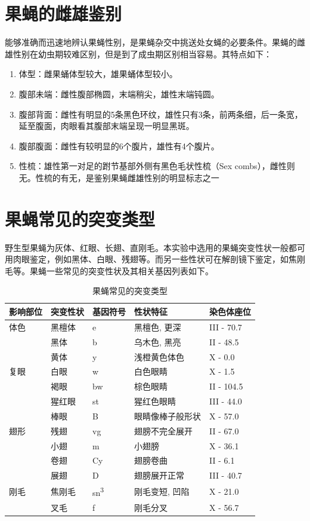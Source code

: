 \documentclass[AutoFakeBold]{LZUThesis}
\begin{document}
\section{果蝇的雌雄鉴别}
能够准确而迅速地辨认果蝇性别，是果蝇杂交中挑送处女蝇的必要条件。果蝇的雌雄性别在幼虫期较难区别，但是到了成虫期区别相当容易。其特点如下：
\begin{enumerate}
    \item 体型：雌果蛹体型较大，雄果蛹体型较小。
    \item 腹部未端：雌性腹部椭圆，末端稍尖，雄性末端钝圆。
    \item 腹部背面：雌性有明显的5条黑色环纹，雄性只有3条，前两条细，后一条宽，延至腹面，肉眼看其腹部末端呈现一明显黑斑。
    \item 腹部腹面：雌性有较明显的6个腹片，雄性有4个腹片。
    \item 性梳：雄性第一对足的跗节基部外侧有黑色毛状性梳（Sex combs），雌性则无。性梳的有无，是鉴别果蝇雌雄性别的明显标志之一
\end{enumerate}

\section{果蝇常见的突变类型}
野生型果蝇为灰体、红眼、长翅、直刚毛。本实验中选用的果蝇突变性状一般都可用肉眼鉴定，例如黑体、白眼、残翅等。而另一些性状可在解剖镜下鉴定，如焦刚毛等。果蝇一些常见的突变性状及其相关基因列表如下。

\begin{longtable}{|l|l|l|l|l|}
    \caption{果蝇常见的突变类型\cite{dai2016}}
    \label{tab:mutation} \\
    \hline
    \textbf{影响部位} & \textbf{突变性状} & \textbf{基因符号} & \textbf{性状特征} & \textbf{染色体座位} \\
    \hline
    体色 & 黑檀体 & e & 黑檀色, 更深 & III - 70.7 \\
    & 黑体 & b & 乌木色, 黑亮 & II - 48.5 \\
    & 黄体 & y & 浅橙黄色体色 & X - 0.0 \\
    \hline
    复眼 & 白眼 & w & 白色眼睛 & X - 1.5 \\
    & 褐眼 & bw & 棕色眼睛 & II - 104.5 \\
    & 猩红眼 & st & 猩红色眼睛 & III - 44.0 \\
    & 棒眼 & B & 眼睛像棒子般形状 & X - 57.0 \\
    \hline
    翅形 & 残翅 & vg & 翅膀不完全展开 & II - 67.0 \\
    & 小翅 & m & 小翅膀 & X - 36.1 \\
    & 卷翅 & Cy & 翅膀卷曲 & II - 6.1 \\
    & 展翅 & D & 翅膀展开正常 & III - 40.7 \\
    \hline
    刚毛 & 焦刚毛 & sn\textsuperscript{3} & 刚毛变短, 凹陷 & X - 21.0 \\
    & 叉毛 & f & 刚毛分叉 & X - 56.7 \\
    \hline
\end{longtable}
\end{document}
